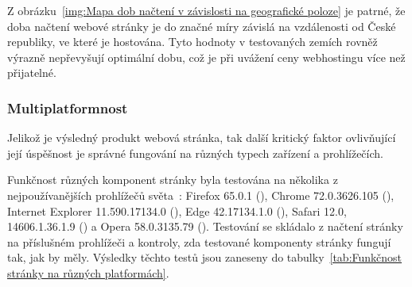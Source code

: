 \documentclass[a4paper, 12pt, twoside]{article}
\begin{document}
  Z obrázku~\ref{img:Mapa dob načtení v závislosti na geografické poloze} je patrné, že doba načtení webové stránky je do značné míry závislá na vzdálenosti od České republiky, ve které je hostována. Tyto hodnoty v testovaných zemích rovněž výrazně nepřevyšují optimální dobu, což je při uvážení ceny webhostingu více než přijatelné.


  \subsubsection{Multiplatformnost}
  Jelikož je výsledný produkt webová stránka, tak další kritický faktor ovlivňující její úspěšnost je správné fungování na různých typech zařízení a prohlížečích.

  Funkčnost různých komponent stránky byla testována na několika z nejpoužívanějších prohlížečů světa~\cite{browser-statistics}: Firefox 65.0.1 (), Chrome 72.0.3626.105 (), Internet Explorer 11.590.17134.0 (), Edge 42.17134.1.0 (), Safari 12.0, 14606.1.36.1.9 () a Opera 58.0.3135.79 (). Testování se skládalo z načtení stránky na příslušném prohlížeči a kontroly, zda testované komponenty stránky fungují tak, jak by měly. Výsledky těchto testů jsou zaneseny do tabulky~\ref{tab:Funkčnost stránky na různých platformách}.
\end{document}

